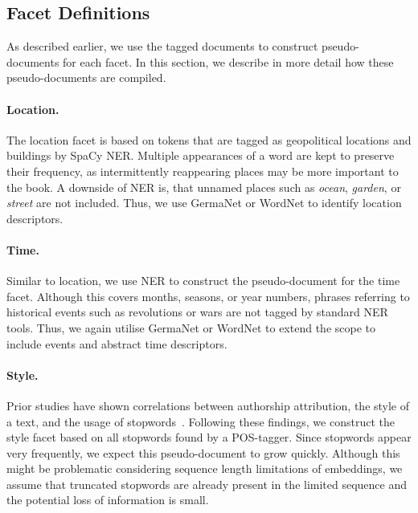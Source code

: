\documentclass[11pt]{article}
\begin{document}
\subsection{Facet Definitions}
As described earlier, we use the tagged documents to construct pseudo-documents for each facet.
In this section, we describe in more detail how these pseudo-documents are compiled.

\paragraph{Location.}
The location facet is based on tokens that are tagged as geopolitical locations and buildings by SpaCy NER.
Multiple appearances of a word are kept to preserve their frequency, as intermittently reappearing places may be more important to the book.
A downside of NER is, that unnamed places such as \textit{ocean}, \textit{garden}, or \textit{street} are not included.
Thus, we use GermaNet or WordNet to identify location descriptors.

\paragraph{Time.}
Similar to location, we use NER to construct the pseudo-document for the time facet.
Although this covers months, seasons, or year numbers, phrases referring to historical events such as revolutions or wars are not tagged by standard NER tools.
Thus, we again utilise  GermaNet or WordNet to extend the scope to include events and abstract time descriptors.

\paragraph{Style.}
Prior studies have shown correlations between authorship attribution, the style of a text, and the usage of stopwords~\citep{arun_stopword_2009, tausczik_psychological_2010, alharthi_authorship_2018}. 
Following these findings, we construct the style facet based on all stopwords found by a POS-tagger.
Since stopwords appear very frequently, we expect this pseudo-document to grow quickly.
Although this might be problematic considering sequence length limitations of embeddings, we assume that truncated stopwords are already present in the limited sequence and the potential loss of information is small.
\end{document}
